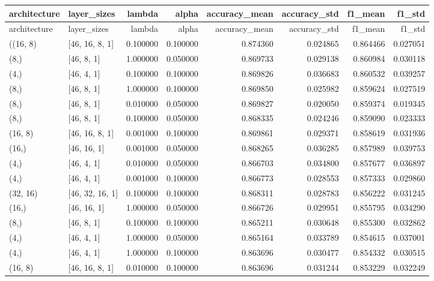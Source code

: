 \documentclass{article}
\begin{document}
\begin{longtable}{llrrrrrr}
\toprule
architecture & layer\_sizes & lambda & alpha & accuracy\_mean & accuracy\_std & f1\_mean & f1\_std \\
\midrule
\endfirsthead

\toprule
architecture & layer\_sizes & lambda & alpha & accuracy\_mean & accuracy\_std & f1\_mean & f1\_std \\
\midrule
\endhead

\bottomrule
\endfoot

\bottomrule
\endlastfoot
((16, 8) & [46, 16, 8, 1] & 0.100000 & 0.100000 & 0.874360 & 0.024865 & 0.864466 & 0.027051 \\
(8,) & [46, 8, 1] & 1.000000 & 0.050000 & 0.869733 & 0.029138 & 0.860984 & 0.030118 \\
(4,) & [46, 4, 1] & 0.100000 & 0.100000 & 0.869826 & 0.036683 & 0.860532 & 0.039257 \\
(8,) & [46, 8, 1] & 1.000000 & 0.100000 & 0.869850 & 0.025982 & 0.859624 & 0.027519 \\
(8,) & [46, 8, 1] & 0.010000 & 0.050000 & 0.869827 & 0.020050 & 0.859374 & 0.019345 \\
(8,) & [46, 8, 1] & 0.100000 & 0.050000 & 0.868335 & 0.024246 & 0.859090 & 0.023333 \\
(16, 8) & [46, 16, 8, 1] & 0.001000 & 0.100000 & 0.869861 & 0.029371 & 0.858619 & 0.031936 \\
(16,) & [46, 16, 1] & 0.001000 & 0.050000 & 0.868265 & 0.036285 & 0.857989 & 0.039753 \\
(4,) & [46, 4, 1] & 0.010000 & 0.050000 & 0.866703 & 0.034800 & 0.857677 & 0.036897 \\
(4,) & [46, 4, 1] & 0.001000 & 0.100000 & 0.866773 & 0.028553 & 0.857333 & 0.029860 \\
(32, 16) & [46, 32, 16, 1] & 0.100000 & 0.100000 & 0.868311 & 0.028783 & 0.856222 & 0.031245 \\
(16,) & [46, 16, 1] & 1.000000 & 0.050000 & 0.866726 & 0.029951 & 0.855795 & 0.034290 \\
(8,) & [46, 8, 1] & 0.100000 & 0.100000 & 0.865211 & 0.030648 & 0.855300 & 0.032862 \\
(4,) & [46, 4, 1] & 1.000000 & 0.050000 & 0.865164 & 0.033789 & 0.854615 & 0.037001 \\
(4,) & [46, 4, 1] & 1.000000 & 0.100000 & 0.863696 & 0.030477 & 0.854332 & 0.030515 \\
(16, 8) & [46, 16, 8, 1] & 0.010000 & 0.100000 & 0.863696 & 0.031244 & 0.853229 & 0.032249 \\

\end{longtable}
\end{document}
